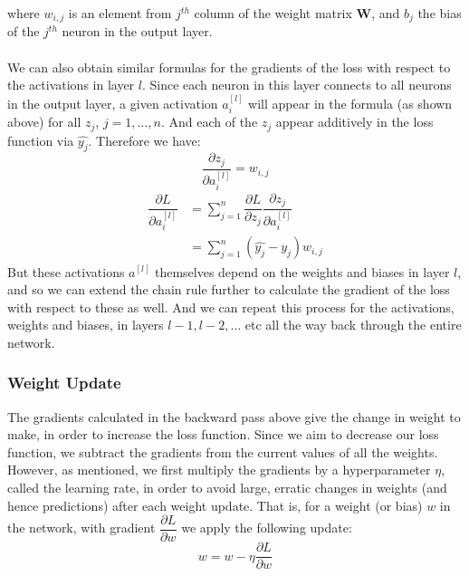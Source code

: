 \documentclass[11pt]{article} %
\theoremstyle{plain}
\theoremstyle{definition}
\begin{document}
where \(w_{i,j}\) is an element from \(j^{th}\) column of the weight matrix \(\mathbf{W}\), and \(b_j\) the bias of the \(j^{th}\) neuron in the output layer. 
\\
\\
\noindent
We can also obtain similar formulas for the gradients of the loss with respect to the activations in layer \(l\). Since each neuron in this layer connects to all neurons in the output layer, a given activation \(a^{[l]}_i\) will appear in the formula (as shown above) for all \(z_j\), \(j=1,\ldots,n\). And each of the \(z_j\) appear additively in the loss function via $\hat{y_j}$. Therefore we have:
\[ \dfrac{\partial z_j}{\partial a^{[l]}_i} = w_{i,j}\]
\begin{align*}
\dfrac{\partial L}{\partial a^{[l]}_i} &= \sum_{j=1}^{n} \dfrac{\partial L}{\partial z_j}\dfrac{\partial z_j}{\partial a^{[l]}_i} \\
&= \sum_{j=1}^{n} (\hat{y_j}-y_j)w_{i,j}
\end{align*}
But these activations \(a^{[l]}\) themselves depend on the weights and biases in layer \(l\), and so we can extend the chain rule further to calculate the gradient of the loss with respect to these as well. And we can repeat this process for the activations, weights and biases, in layers \({l-1}, {l-2}, \ldots \) etc all the way back through the entire network.   

\subsubsection{Weight Update}
The gradients calculated in the backward pass above give the change in weight to make, in order to increase the loss function. Since we aim to decrease our loss function, we subtract the gradients from the current values of all the weights. However, as mentioned, we first multiply the gradients by a hyperparameter \(\eta\), called the learning rate, in order to avoid large, erratic changes in weights (and hence predictions) after each weight update. That is, for a weight (or bias) \(w\) in the network, with gradient \(\dfrac{\partial L}{\partial w}\) we apply the following update:
\[ w = w - \eta \dfrac{\partial L}{\partial w} \]
\end{document}
